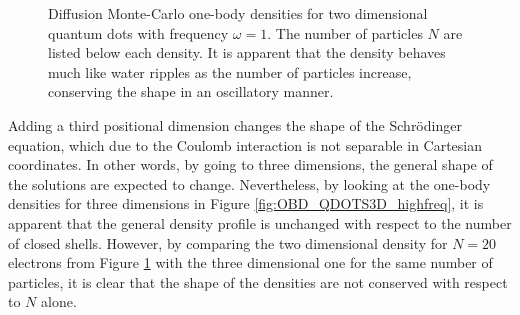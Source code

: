 \begin{figure}
\begin{center}
  \caption{Diffusion Monte-Carlo one-body densities for two dimensional quantum dots with frequency $\omega=1$. The number of particles $N$ are listed below each density. It is apparent that the density behaves much like water ripples as the number of particles increase, conserving the shape in an oscillatory manner.}
  \label{fig:OBD_DMC_QDOTS_w1} 
 \end{center}
\end{figure}

\clearpage

 Adding a third positional dimension changes the shape of the Schrödinger equation, which due to the Coulomb interaction is not separable in Cartesian coordinates. In other words, by going to three dimensions, the general shape of the solutions are expected to change. Nevertheless, by looking at the one-body densities for three dimensions in Figure \ref{fig:OBD_QDOTS3D_highfreq}, it is apparent that the general density profile is unchanged with respect to the number of closed shells. However, by comparing the two dimensional density for $N=20$ electrons from Figure \ref{fig:OBD_DMC_QDOTS_w1} with the three dimensional one for the same number of particles, it is clear that the shape of the densities are not conserved with respect to $N$ alone.

